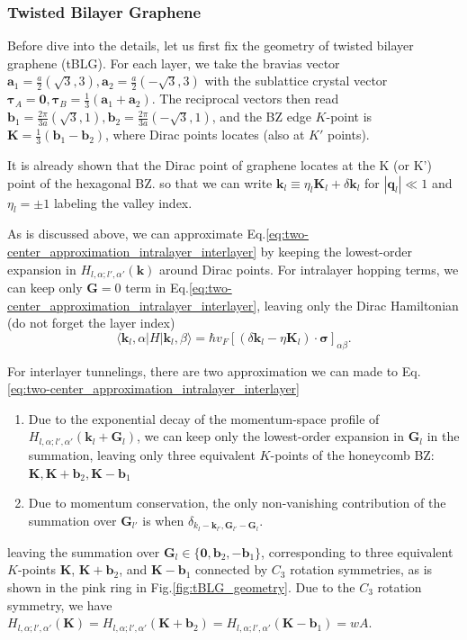 \subsubsection{Twisted Bilayer Graphene}
Before dive into the details, let us first fix the geometry of twisted bilayer graphene (tBLG). For each layer, we take the bravias vector $\bm a_1=\frac{a}{2}(\sqrt{3},3), \bm a_2=\frac{a}{2}(-\sqrt{3},3)$ with the sublattice crystal vector $\bm\tau_A=\bm 0, \bm\tau_B=\frac{1}{3}(\bm a_1+\bm a_2)$. The reciprocal vectors then read $\bm b_1=\frac{2\pi}{3a}(\sqrt{3},1), \bm b_2=\frac{2\pi}{3a}(-\sqrt{3},1)$, and the BZ edge $K$-point is $\bm K=\frac{1}{3}(\bm b_1-\bm b_2)$, where Dirac points locates (also at $K'$ points).

It is already shown that the Dirac point of graphene locates at the K (or K') point of the hexagonal BZ.  so that we can write $\bm k_l\equiv\eta_l\bm K_l+\delta\bm k_l$ for $|\bm q_l|\ll1$ and $\eta_l=\pm1$ labeling the valley index.

As is discussed above, we can approximate Eq.\eqref{eq:two-center_approximation_intralayer_interlayer} by keeping the lowest-order expansion in $H_{l,\alpha;l',\alpha'}(\bm k)$ around Dirac points. For intralayer hopping terms, we can keep only $\bm G=0$ term in Eq.\eqref{eq:two-center_approximation_intralayer_interlayer}, leaving only the Dirac Hamiltonian (do not forget the layer index)
\begin{equation*}
    \langle\bm k_l,\alpha|H|\bm k_l,\beta\rangle=\hbar v_F[(\delta\bm k_l-\eta\bm K_l)\cdot\bm\sigma]_{\alpha\beta}.
\end{equation*}

For interlayer tunnelings, there are two approximation we can made to Eq.\eqref{eq:two-center_approximation_intralayer_interlayer}
\begin{enumerate}
    \item Due to the exponential decay of the momentum-space profile of $H_{l,\alpha;l',\alpha'}(\bm k_l+\bm G_l)$, we can keep only the lowest-order expansion in $\bm G_l$ in the summation, leaving only three equivalent $K$-points of the honeycomb BZ: $\bm K,\bm K+\bm b_2,\bm K-\bm b_1$
    \item Due to momentum conservation, the only non-vanishing contribution of the summation over $\bm G_{l'}$ is when $\delta_{k_l-\bm k_{l'},\bm G_{l'}-\bm G_l}$.
\end{enumerate}
leaving the summation over $\bm G_l\in\{\bm 0,\bm b_2,-\bm b_1\}$, corresponding to three equivalent $K$-points $\bm K$, $\bm K+\bm b_2$, and $\bm K-\bm b_1$ connected by $C_3$ rotation symmetries, as is shown in the pink ring in Fig.\ref{fig:tBLG_geometry}. Due to the $C_3$ rotation symmetry, we have $H_{l,\alpha;l',\alpha'}(\bm K)=H_{l,\alpha;l',\alpha'}(\bm K+\bm b_2)=H_{l,\alpha;l',\alpha'}(\bm K-\bm b_1)=wA$.

